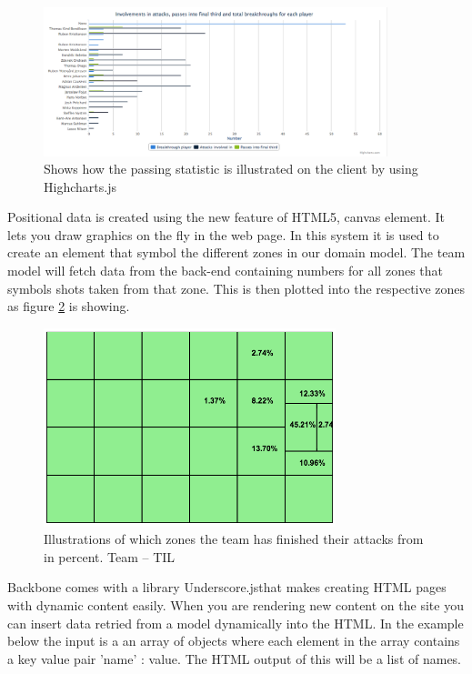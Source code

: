 
\begin{figure}[ht!]
\centering
\includegraphics[width=100mm]{images/general/chart_passes.png}
\caption{Shows how the passing statistic is illustrated on the client by using Highcharts.js}
\label{fig:chart}
\end{figure}

Positional data is created using the new feature of HTML5, canvas element. It lets you draw graphics on the fly in the web page. In this system it is used to create an element that symbol the different zones in our domain model. The team model will fetch data from the back-end containing numbers for all zones that symbols shots taken from that zone. This is then plotted into the respective zones as figure \ref{fig:attacking_zones} is showing.

\begin{figure}[ht!]
\centering
\includegraphics[width=85mm]{images/general/finishing_zones.png}
\caption{Illustrations of which zones the team has finished their attacks from in percent. Team – \ac{TIL}}
\label{fig:attacking_zones}
\end{figure}

Backbone comes with a library Underscore.js\footnotemark that makes creating HTML pages with dynamic content easily. When you are rendering new content on the site you can insert data retried from a model dynamically into the HTML. In the example below the input is a an array of objects where each element in the array contains a key value pair 'name' : value. The HTML output of this will be a list of names.

